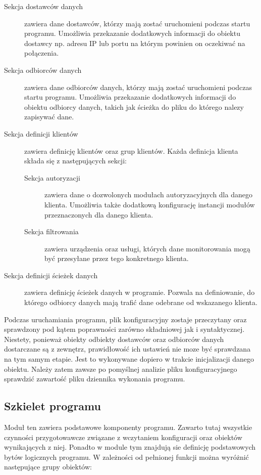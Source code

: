 \begin{description}
\item[Sekcja dostawców danych] zawiera dane dostawców, którzy mają
  zostać uruchomieni podczas startu programu. Umożliwia przekazanie
  dodatkowych informacji do obiektu dostawcy np. adresu IP lub portu
  na którym powinien on oczekiwać na połączenia. 
\item[Sekcja odbiorców danych] zawiera dane odbiorców danych, którzy
  mają zostać uruchomieni podczas startu programu. Umożliwia
  przekazanie dodatkowych informacji do obiektu odbiorcy danych,
  takich jak ścieżka do pliku do którego nalezy zapisywać dane. 
\item[Sekcja definicji klientów] zawiera definicję klientów oraz grup
  klientów. Każda definicja klienta składa się z następujących sekcji:
  \begin{description}
  \item[Sekcja autoryzacji] zawiera dane o dozwolonych modułach
    autoryzacyjnych dla danego klienta. Umożliwia także dodatkową
    konfigurację instancji modułów przeznaczonych dla danego klienta.
  \item[Sekcja filtrowania] zawiera urządzenia oraz usługi, których
    dane monitorowania mogą być przesyłane przez tego konkretnego
    klienta.
  \end{description}
\item[Sekcja definicji ścieżek danych] zawiera definicję ścieżek
  danych w programie. Pozwala na definiowanie, do którego odbiorcy
  danych mają trafić dane odebrane od wskazanego klienta.
\end{description}

Podczas uruchamiania programu, plik konfiguracyjny zostaje przeczytany
oraz sprawdzony pod kątem poprawności zarówno składniowej jak i
syntaktycznej. Niestety, ponieważ obiekty odbiekty dostawców oraz
odbiorców danych dostarczane są z zewnętrz, prawidłowość ich ustawień
nie moze być sprawdzana na tym samym etapie. Jest to wykonywane
dopiero w trakcie inicjalizacji danego obiektu. Należy zatem zawsze po
pomyślnej analizie pliku konfiguracyjnego sprawdzić zawartość pliku
dziennika wykonania programu.

\subsection[Szkielet programu][Szkielet programu]{Szkielet programu}

Moduł ten zawiera podstawowe komponenty programu. Zawarto tutaj
wszystkie czynności przygotowawcze związane z wczytaniem konfiguracji
oraz obiektów wynikających z niej. Ponadto w module tym znajdują sie
definicję podstawowych bytów logicznych programu. W zależności od
pełnionej funkcji można wyróżnić następujące grupy obiektów:

